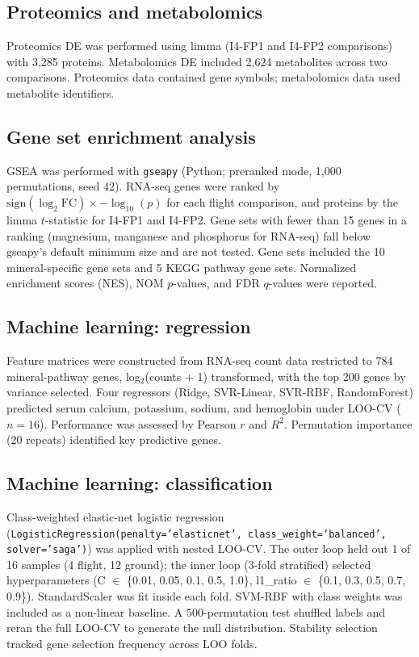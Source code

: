 \documentclass[11pt,a4paper]{article}
\begin{document}
\subsection{Proteomics and metabolomics}

Proteomics DE was performed using limma (I4-FP1 and I4-FP2 comparisons) with 3,285 proteins. Metabolomics DE included 2,624 metabolites across two comparisons. Proteomics data contained gene symbols; metabolomics data used metabolite identifiers.

\subsection{Gene set enrichment analysis}

GSEA was performed with \texttt{gseapy} (Python; preranked mode, 1,000 permutations, seed 42). RNA-seq genes were ranked by $\mathrm{sign}(\log_2\text{FC}) \times -\log_{10}(p)$ for each flight comparison, and proteins by the limma $t$-statistic for I4-FP1 and I4-FP2. Gene sets with fewer than 15 genes in a ranking (magnesium, manganese and phosphorus for RNA-seq) fall below gseapy's default minimum size and are not tested. Gene sets included the 10 mineral-specific gene sets and 5 KEGG pathway gene sets. Normalized enrichment scores (NES), NOM $p$-values, and FDR $q$-values were reported.

\subsection{Machine learning: regression}

Feature matrices were constructed from RNA-seq count data restricted to 784 mineral-pathway genes, log$_2$(counts + 1) transformed, with the top 200 genes by variance selected. Four regressors (Ridge, SVR-Linear, SVR-RBF, RandomForest) predicted serum calcium, potassium, sodium, and hemoglobin under LOO-CV ($n = 16$). Performance was assessed by Pearson $r$ and $R^2$. Permutation importance (20 repeats) identified key predictive genes.

\subsection{Machine learning: classification}

Class-weighted elastic-net logistic regression (\texttt{LogisticRegression(penalty='elasticnet', class\_weight='balanced', solver='saga')}) was applied with nested LOO-CV. The outer loop held out 1 of 16 samples (4 flight, 12 ground); the inner loop (3-fold stratified) selected hyperparameters (C $\in$ \{0.01, 0.05, 0.1, 0.5, 1.0\}, l1\_ratio $\in$ \{0.1, 0.3, 0.5, 0.7, 0.9\}). StandardScaler was fit inside each fold. SVM-RBF with class weights was included as a non-linear baseline. A 500-permutation test shuffled labels and reran the full LOO-CV to generate the null distribution. Stability selection tracked gene selection frequency across LOO folds.
\end{document}
